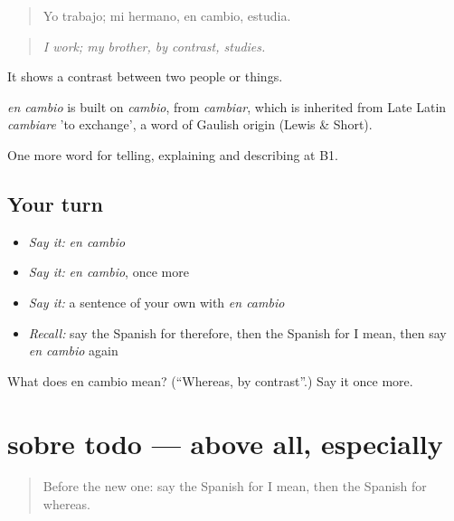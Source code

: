 \begin{quote}
Yo trabajo; mi hermano, en cambio, estudia.
\end{quote}

\begin{quote}
\emph{I work; my brother, by contrast, studies.}
\end{quote}

It shows a contrast between two people or things.

\begin{cousinweb}
\emph{en cambio} is built on \emph{cambio}, from \emph{cambiar}, which is inherited from Late Latin \emph{cambiare} 'to exchange', a word of Gaulish origin (Lewis \& Short).
\end{cousinweb}

\begin{grammarlens}[title={What you've built}]
One more word for telling, explaining and describing at B1.
\end{grammarlens}

\subsection*{Your turn}
\begin{itemize}
\raggedright
  \item \emph{Say it:} \emph{en cambio}
  \item \emph{Say it:} \emph{en cambio}, once more
  \item \emph{Say it:} a sentence of your own with \emph{en cambio}
  \item \emph{Recall:} say the Spanish for therefore, then the Spanish for I mean, then say \emph{en cambio} again
\end{itemize}

\begin{tcolorbox}[breakable,colback=teal!4,colframe=teal!35!black,title={Before you move on}]
What does en cambio mean? (\textquotedblleft{}Whereas, by contrast\textquotedblright{}.) Say it once more.
\end{tcolorbox}
\section[sobre todo]{sobre todo — above all, especially}

\label{lesson:ES-C588-sobre-todo}



\begin{quote}
Before the new one: say the Spanish for I mean, then the Spanish for whereas.
\end{quote}

